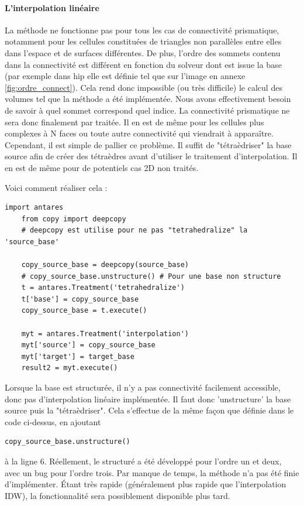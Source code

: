 \label{prisme}\paragraph{L'interpolation linéaire}

La méthode ne fonctionne pas pour tous les cas de connectivité prismatique, notamment pour les cellules constituées de triangles non parallèles entre elles dans l'espace et de surfaces différentes. De plus, l'ordre des sommets contenu dans la connectivité est différent en fonction du solveur dont est issue la base (par exemple dans hip elle est définie tel que sur l'image en annexe \ref{fig:ordre_connect}). Cela rend donc impossible (ou très difficile) le calcul des volumes tel que la méthode a été implémentée. Nous avons effectivement besoin de savoir à quel sommet correspond quel indice. La connectivité prismatique ne sera donc finalement par traitée. Il en est de même pour les cellules plus complexes à N faces ou toute autre connectivité qui viendrait à apparaître.
Cependant, il est simple de pallier ce problème. Il suffit de "tétraèdriser" la base source afin de créer des tétraèdres avant d'utiliser le traitement d'interpolation. Il en est de même pour de potentiels cas 2D non traités.

Voici comment réaliser cela :

\begin{lstlisting}[caption=Tetrahedralize pour interpoler linéairement tous types de cellules, label={lst:tet}]
    import antares
    from copy import deepcopy
    # deepcopy est utilise pour ne pas "tetrahedralize" la 'source_base' 
    
    copy_source_base = deepcopy(source_base)
    # copy_source_base.unstructure() # Pour une base non structure
    t = antares.Treatment('tetrahedralize')
    t['base'] = copy_source_base
    copy_source_base = t.execute()

    myt = antares.Treatment('interpolation')
    myt['source'] = copy_source_base
    myt['target'] = target_base
    result2 = myt.execute()
\end{lstlisting}

Lorsque la base est structurée, il n'y a pas connectivité facilement accessible, donc pas d'interpolation linéaire implémentée. Il faut donc 'unstructure' la base source puis la "tétraèdriser". Cela s'effectue de la même façon que définie dans le code ci-dessus, en ajoutant 
\begin{lstlisting}[]
    copy_source_base.unstructure()
\end{lstlisting}
à la ligne 6. Réellement, le structuré a été développé pour l'ordre un et deux, avec un bug pour l'ordre trois. Par manque de temps, la méthode n'a pas été finie d'implémenter. Étant très rapide (généralement plus rapide que l'interpolation IDW), la fonctionnalité sera possiblement disponible plus tard.


